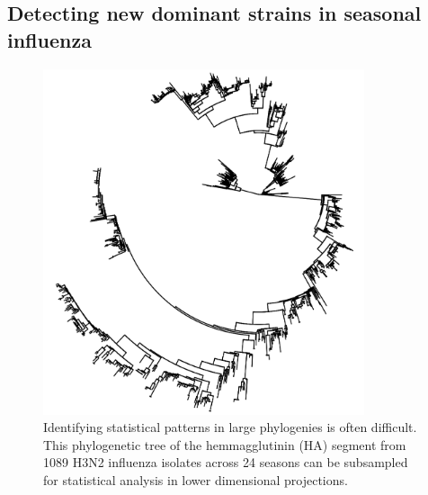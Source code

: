 \documentclass[a4paper,11pt]{article}
\begin{document}
\subsection{Detecting new dominant strains in seasonal influenza}

\begin{figure}
    \centering
    \includegraphics[height=4in]{../figures/influenza_overall_tree.png}
    \caption{Identifying statistical patterns in large phylogenies is often difficult. This phylogenetic tree of the hemmagglutinin (HA) segment from 1089 H3N2 influenza isolates across 24 seasons can be subsampled for statistical analysis in lower dimensional projections.}
     \label{fig:HA_tree}
\end{figure}

\end{document}
